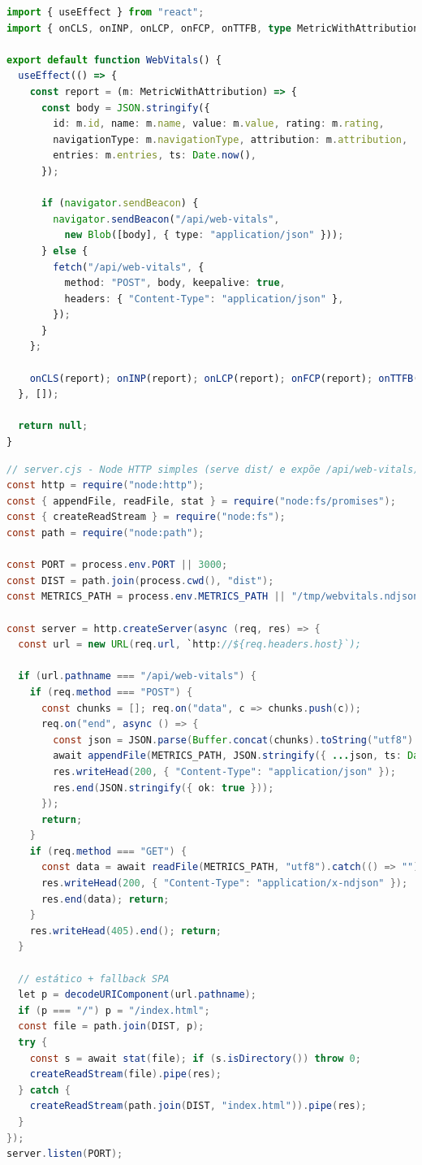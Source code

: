 \begin{lstlisting}[language=TypeScript,caption={Envio de métricas no cliente (CSR/React+Vite)}]
import { useEffect } from "react";
import { onCLS, onINP, onLCP, onFCP, onTTFB, type MetricWithAttribution } from "web-vitals/attribution";

export default function WebVitals() {
  useEffect(() => {
    const report = (m: MetricWithAttribution) => {
      const body = JSON.stringify({
        id: m.id, name: m.name, value: m.value, rating: m.rating,
        navigationType: m.navigationType, attribution: m.attribution,
        entries: m.entries, ts: Date.now(),
      });

      if (navigator.sendBeacon) {
        navigator.sendBeacon("/api/web-vitals",
          new Blob([body], { type: "application/json" }));
      } else {
        fetch("/api/web-vitals", {
          method: "POST", body, keepalive: true,
          headers: { "Content-Type": "application/json" },
        });
      }
    };

    onCLS(report); onINP(report); onLCP(report); onFCP(report); onTTFB(report);
  }, []);

  return null;
}
\end{lstlisting}

\begin{lstlisting}[language=Java,caption={Servidor estático + endpoint (CSR/React+Vite)}]
// server.cjs - Node HTTP simples (serve dist/ e expõe /api/web-vitals)
const http = require("node:http");
const { appendFile, readFile, stat } = require("node:fs/promises");
const { createReadStream } = require("node:fs");
const path = require("node:path");

const PORT = process.env.PORT || 3000;
const DIST = path.join(process.cwd(), "dist");
const METRICS_PATH = process.env.METRICS_PATH || "/tmp/webvitals.ndjson";

const server = http.createServer(async (req, res) => {
  const url = new URL(req.url, `http://${req.headers.host}`);

  if (url.pathname === "/api/web-vitals") {
    if (req.method === "POST") {
      const chunks = []; req.on("data", c => chunks.push(c));
      req.on("end", async () => {
        const json = JSON.parse(Buffer.concat(chunks).toString("utf8") || "{}");
        await appendFile(METRICS_PATH, JSON.stringify({ ...json, ts: Date.now() }) + "\n", "utf8");
        res.writeHead(200, { "Content-Type": "application/json" });
        res.end(JSON.stringify({ ok: true }));
      });
      return;
    }
    if (req.method === "GET") {
      const data = await readFile(METRICS_PATH, "utf8").catch(() => "");
      res.writeHead(200, { "Content-Type": "application/x-ndjson" });
      res.end(data); return;
    }
    res.writeHead(405).end(); return;
  }

  // estático + fallback SPA
  let p = decodeURIComponent(url.pathname);
  if (p === "/") p = "/index.html";
  const file = path.join(DIST, p);
  try {
    const s = await stat(file); if (s.isDirectory()) throw 0;
    createReadStream(file).pipe(res);
  } catch {
    createReadStream(path.join(DIST, "index.html")).pipe(res);
  }
});
server.listen(PORT);
\end{lstlisting}

